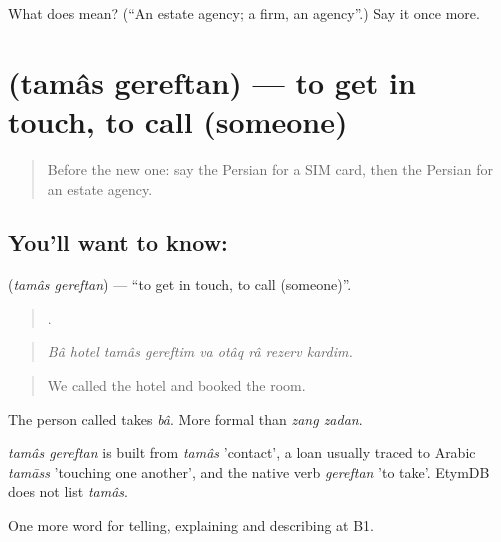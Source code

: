 \begin{tcolorbox}[breakable,colback=teal!4,colframe=teal!35!black,title={Before you move on}]
What does  mean? (\textquotedblleft{}An estate agency; a firm, an agency\textquotedblright{}.) Say it once more.
\end{tcolorbox}
\section[\texorpdfstring{\fa{تماس} \fa{گرفتن} (tamâs gereftan)}{تماس گرفتن (tamâs gereftan)}]{  (tamâs gereftan) — to get in touch, to call (someone)}

\label{lesson:FA-C456-tamas-gereftan}



\begin{quote}
Before the new one: say the Persian for a SIM card, then the Persian for an estate agency.
\end{quote}

\subsection*{You'll want to know:  }
\textbf{ } (\emph{tamâs gereftan}) — \textquotedblleft{}to get in touch, to call (someone)\textquotedblright{}.

\begin{quote}
        .
\end{quote}

\begin{quote}
\emph{Bâ hotel tamâs gereftim va otâq râ rezerv kardim.}
\end{quote}

\begin{quote}
We called the hotel and booked the room.
\end{quote}

The person called takes \emph{bâ}. More formal than \emph{zang zadan}.

\begin{cousinweb}
\emph{tamâs gereftan} is built from \emph{tamâs} 'contact', a loan usually traced to Arabic \emph{tamāss} 'touching one another', and the native verb \emph{gereftan} 'to take'. EtymDB does not list \emph{tamâs}.
\end{cousinweb}

\begin{grammarlens}[title={What you've built}]
One more word for telling, explaining and describing at B1.
\end{grammarlens}

